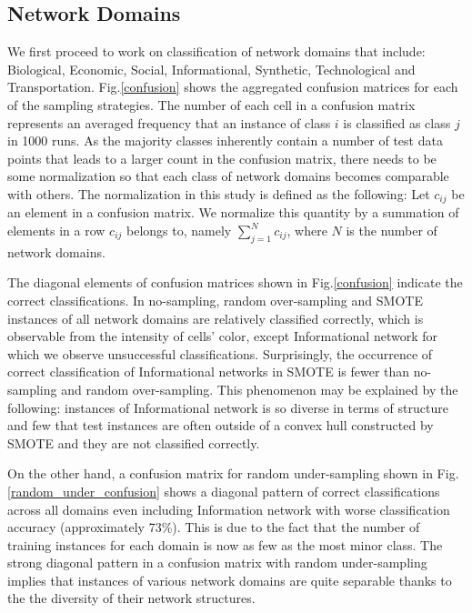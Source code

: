 \documentclass{article}
\begin{document}
 
\subsection{Network Domains} 
We first proceed to work on classification of network domains that include: Biological, Economic, Social, Informational, Synthetic, Technological and Transportation.
Fig.\ref{confusion} shows the aggregated confusion matrices for each of the sampling strategies. The number of each cell in a confusion matrix represents an averaged frequency that an instance of class $i$ is classified as class $j$ in 1000 runs. As the majority classes inherently contain a number of test data points that leads to a larger count in the confusion matrix, there needs to be some normalization so that each class of network domains becomes comparable with others. The normalization in this study is defined as the following: Let $c_{ij}$ be an element in a confusion matrix. We normalize this quantity by a summation of elements in a row $c_{ij}$ belongs to, namely $\sum_{j=1}^N c_{ij}$, where $N$ is the number of network domains. 

The diagonal elements of confusion matrices shown in Fig.\ref{confusion} indicate the correct classifications. In no-sampling, random over-sampling and SMOTE instances of all network domains are relatively classified correctly, which is observable from the intensity of cells' color, except Informational network for which we observe unsuccessful classifications. Surprisingly, the occurrence of correct classification of Informational networks in SMOTE is fewer than no-sampling and random over-sampling. This phenomenon may be explained by the following: instances of Informational network is so diverse in terms of structure and few that test instances are often outside of a convex hull constructed by SMOTE and they are not classified correctly.  

On the other hand, a confusion matrix for random under-sampling shown in Fig.\ref{random_under_confusion} shows a diagonal pattern of  correct classifications across all domains even including Information network with worse classification accuracy (approximately 73\%). This is due to the fact that the number of training instances for each domain is now as few as the most minor class. The strong diagonal pattern in a confusion matrix with random under-sampling implies that instances of various network domains are quite separable thanks to the the diversity of their network structures.

\end{document}

